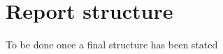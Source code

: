 \section{Report structure}
\label{sec:report_structure}
To be done once a final structure has been stated